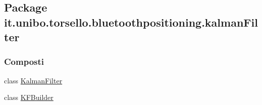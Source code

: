 \hypertarget{namespaceit_1_1unibo_1_1torsello_1_1bluetoothpositioning_1_1kalmanFilter}{}\subsection{Package it.\+unibo.\+torsello.\+bluetoothpositioning.\+kalman\+Filter}
\label{namespaceit_1_1unibo_1_1torsello_1_1bluetoothpositioning_1_1kalmanFilter}
\subsubsection*{Composti}
\begin{DoxyCompactItemize}
\item 
class \hyperlink{classit_1_1unibo_1_1torsello_1_1bluetoothpositioning_1_1kalmanFilter_1_1KalmanFilter}{Kalman\+Filter}
\item 
class \hyperlink{classit_1_1unibo_1_1torsello_1_1bluetoothpositioning_1_1kalmanFilter_1_1KFBuilder}{K\+F\+Builder}
\end{DoxyCompactItemize}
